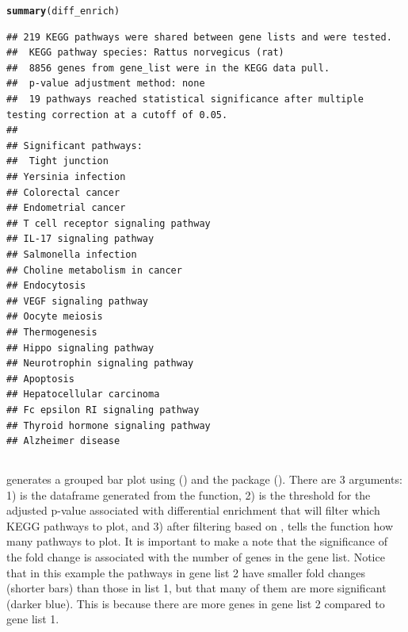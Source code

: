 \documentclass[article]{jss}\usepackage[]{graphicx}\usepackage[]{color}
\makeatletter
\newcommand{\hlstd}[1]{\textcolor[rgb]{0.345,0.345,0.345}{#1}}%
\newcommand{\hlkwd}[1]{\textcolor[rgb]{0.737,0.353,0.396}{\textbf{#1}}}%
\newenvironment{kframe}{%
 \def\at@end@of@kframe{}%
 \ifinner\ifhmode%
  \def\at@end@of@kframe{\end{minipage}}%
  \begin{minipage}{\columnwidth}%
 \fi\fi%
 \def\FrameCommand##1{\hskip\@totalleftmargin \hskip-\fboxsep
 \colorbox{shadecolor}{##1}\hskip-\fboxsep
     \hskip-\linewidth \hskip-\@totalleftmargin \hskip\columnwidth}%
 \MakeFramed {\advance\hsize-\width
   \@totalleftmargin\z@ \linewidth\hsize
   \@setminipage}}%
 {\par\unskip\endMakeFramed%
 \at@end@of@kframe}
\newenvironment{knitrout}{}{} %
\makeatother
\begin{document}
\begin{knitrout}
\color{fgcolor}\begin{kframe}
\begin{alltt}
\hlkwd{summary}\hlstd{(diff_enrich)}
\end{alltt}
\begin{verbatim}
## 219 KEGG pathways were shared between gene lists and were tested. 
##  KEGG pathway species: Rattus norvegicus (rat)
##  8856 genes from gene_list were in the KEGG data pull. 
##  p-value adjustment method: none
##  19 pathways reached statistical significance after multiple testing correction at a cutoff of 0.05. 
##  
## Significant pathways: 
##  Tight junction
## Yersinia infection
## Colorectal cancer
## Endometrial cancer
## T cell receptor signaling pathway
## IL-17 signaling pathway
## Salmonella infection
## Choline metabolism in cancer
## Endocytosis
## VEGF signaling pathway
## Oocyte meiosis
## Thermogenesis
## Hippo signaling pathway
## Neurotrophin signaling pathway
## Apoptosis
## Hepatocellular carcinoma
## Fc epsilon RI signaling pathway
## Thyroid hormone signaling pathway
## Alzheimer disease
\end{verbatim}
\end{kframe}
\end{knitrout}

\subsection{}

 generates a grouped bar plot using
 (\cite{Hadley:2106}) and the 
package (\cite{Elio:2019}). There are 3 arguments: 1)
 is the dataframe generated from the
 function, 2)  is the threshold
for the adjusted p-value associated with differential
enrichment that will filter which KEGG pathways to plot, and
3) after filtering based on ,  tells the
function how many pathways to plot. It is important to make
a note that the significance of the fold change is associated
with the number of genes in the gene list. Notice that in this
example the pathways in gene list 2 have smaller fold changes
(shorter bars) than those in list 1, but that many of them are
more significant (darker blue). This is because there are
more genes in gene list 2 compared to gene list 1.
\end{document}
